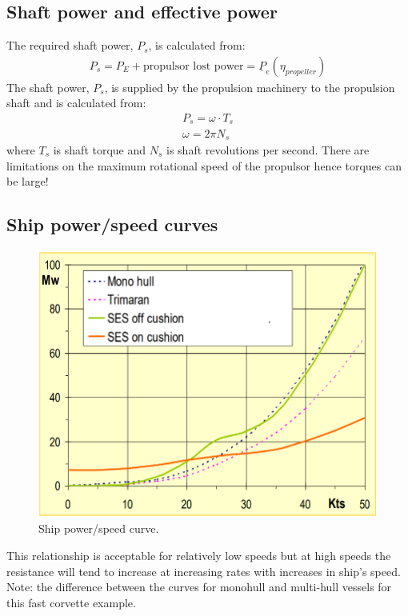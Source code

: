 \subsection{Shaft power and effective power}
The required shaft power, $P_s$, is calculated from:
\begin{gather}
    P_s = P_E + \textrm{propulsor lost power} = \underline{P}_e (\eta_{propeller})
\end{gather}
The shaft power, $P_s$, is supplied by the propulsion machinery to the propulsion shaft and is calculated from:
\begin{gather}
    P_s = \omega \cdot T_s\\
    \omega = 2\pi N_s
\end{gather}
where $T_s$ is shaft torque and $N_s$ is shaft revolutions per second. There are limitations on the maximum rotational speed of the propulsor hence torques can be large!
\subsection{Ship power/speed curves}
\begin{figure}[H]
    \centering
    \includegraphics[width =0.8 \textwidth]{img/figure53.png}
    \caption{Ship power/speed curve.}
\end{figure}
This relationship is acceptable for relatively low speeds but at high speeds the resistance will tend to increase at increasing rates with increases in ship's speed. Note: the difference between the curves for monohull and multi-hull vessels for this fast corvette example.
